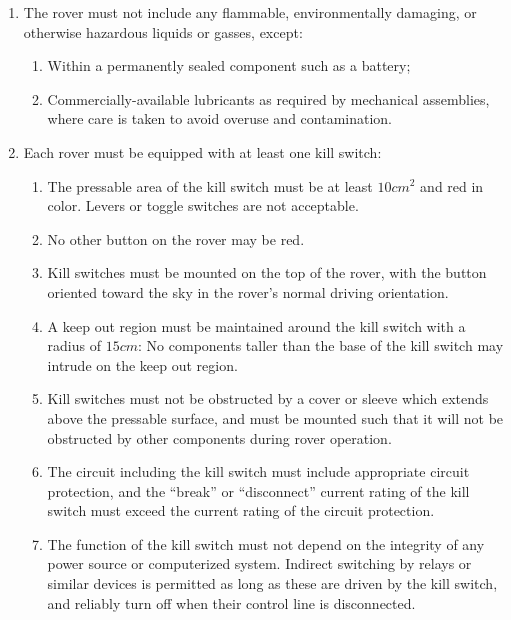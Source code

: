     \begin{enumerate}
        \item The rover must not include any flammable, environmentally damaging, or otherwise hazardous liquids or gasses, except:
        \begin{enumerate}
            \item Within a permanently sealed component such as a battery; \label{battery}
            \item Commercially-available lubricants as required by mechanical assemblies, where care is taken to avoid overuse and contamination. \label{lubricants}
        \end{enumerate}
        \item Each rover must be equipped with at least one kill switch:
        \begin{enumerate}
            \item The pressable area of the kill switch must be at least $10cm^2$ and red in color. Levers or toggle switches are not acceptable.
            \item No other button on the rover may be red.
            \item Kill switches must be mounted on the top of the rover, with the button oriented toward the sky in the rover’s normal driving orientation.
            \item A keep out region must be maintained around the kill switch with a radius of $15cm$: No components taller than the base of the kill switch may intrude on the keep out region.
            \item Kill switches must not be obstructed by a cover or sleeve which extends above the pressable surface, and must be mounted such that it will not be obstructed by other components during rover operation.
            \item The circuit including the kill switch must include appropriate circuit protection, and the “break” or “disconnect” current rating of the kill switch must exceed the current rating of the circuit protection.
            \item The function of the kill switch must not depend on the integrity of any power source or computerized system. Indirect switching by relays or similar devices is permitted as long as these are driven by the kill switch, and reliably turn off when their control line is disconnected.

\end{enumerate}
\end{enumerate}
